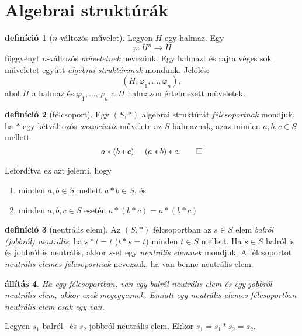 \documentclass[9pt, a4paper, showtrims]{memoir}
\makeatletter
\renewenvironment{proof}[1][\proofname]
    {\par\pushQED{\qed}%
    \normalfont \topsep6\p@\@plus6\p@\relax
    \trivlist
    \item[\hskip\labelsep
        \itshape
    #1\@addpunct{:}]\ignorespaces}
    {\popQED\endtrivlist\@endpefalse}
\theoremstyle{plain}
\newtheorem{proposition}{állítás}[chapter]
\theoremstyle{remark}
\theoremstyle{definition}
\newtheorem{definition}[proposition]{definíció}
\makeatother
\begin{document}
\section{Algebrai struktúrák}
\begin{definition}[$n$-változós művelet]
    Legyen $H$ egy halmaz. Egy 
    \[
        \varphi\colon H^n\to H
    \]
    függvényt $n$-változós \emph{műveletnek} nevezünk.
    Egy halmazt és rajta véges sok műveletet együtt \emph{algebrai struktúrának} mondunk.
    Jelölés: 
    $$\left(H,\varphi_1,\dots,\varphi_n  \right),$$ 
    ahol $H$ a halmaz és
    $\varphi_1,\dots,\varphi_n$ a $H$ halmazon értelmezett műveletek.
\end{definition}
\begin{definition}[félcsoport]
    Egy $\left( S,\ast \right)$ algebrai struktúrát \emph{félcsoportnak} mondjuk,
    ha $\ast$ egy kétváltozós \emph{asszociatív}
    művelete az $S$ halmaznak,
    azaz minden $a,b,c\in S$ mellett
    \[
        a\ast\left( b\ast c \right)=\left( a\ast b\right)\ast c.\qedhere
    \]
\end{definition}
Lefordítva ez azt jelenti, hogy 
\begin{enumerate}
    \item minden $a,b\in S$ mellett $a\ast b\in S$, és
    \item minden $a,b,c\in S$ esetén $a\ast\left( b\ast c \right)=a\ast\left( b\ast c \right)$
\end{enumerate}
\begin{definition}[neutrális elem]
    Az $\left( S,\ast \right)$ félcsoportban az $s\in S$ elem \emph{balról (jobbról) neutrális},
    ha $s\ast t=t$ ($t\ast s=t$) minden $t\in S$ mellett.
    Ha $s\in S$ balról is és jobbról is neutrális, akkor $s$-et egy \emph{neutrális elemnek}
    mondjuk.
    A félcsoportot \emph{neutrális elemes félcsoportnak} nevezzük, ha van benne neutrális elem.
\end{definition}
\begin{proposition}
    Ha egy félcsoportban, van egy balról neutrális elem és egy jobbról neutrális elem, 
    akkor ezek megegyeznek. 
    Emiatt egy neutrális elemes félcsoportban neutrális elem csak egy van.
\end{proposition}
\begin{proof}
    Legyen $s_1$ balról-- és $s_2$ jobbról neutrális elem.
    Ekkor
    \(
    s_1=s_1\ast s_2=s_2.
    \)
\end{proof}
\end{document}
